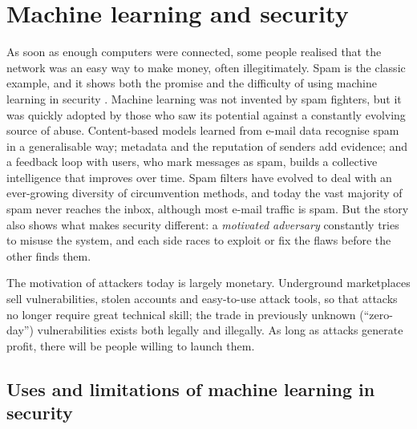 \section{Machine learning and security}\label{sec:security}

As soon as enough computers were connected, some people realised that the network was an easy way to make money, often illegitimately. Spam is the classic example, and it shows both the
promise and the difficulty of using machine learning in security \citep{chio2018machine}. Machine
learning was not invented by spam fighters, but it was quickly adopted by those who saw its potential
against a constantly evolving source of abuse. Content-based models learned from e-mail data recognise
spam in a generalisable way; metadata and the reputation of senders add evidence; and a feedback loop
with users, who mark messages as spam, builds a collective intelligence that improves over time. Spam
filters have evolved to deal with an ever-growing diversity of circumvention methods, and today the vast
majority of spam never reaches the inbox, although most e-mail traffic is spam. But the story also
shows what makes security different: a \emph{motivated adversary} constantly tries to misuse the
system, and each side races to exploit or fix the flaws before the other finds them.

The motivation of attackers today is largely monetary. Underground marketplaces sell vulnerabilities,
stolen accounts and easy-to-use attack tools, so that attacks no longer require great technical skill;
the trade in previously unknown (``zero-day'') vulnerabilities exists both legally and illegally. As long
as attacks generate profit, there will be people willing to launch them.

\subsection{Uses and limitations of machine learning in security}


